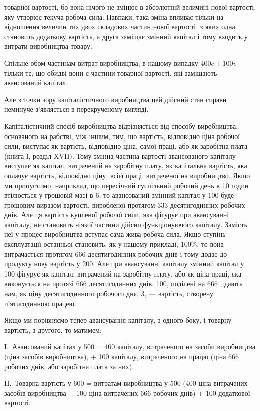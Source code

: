 \parcont{}  %
товарної вартості, бо вона нічого не змінює в абсолютній величині
нової вартості, яку утворює текуча робоча сила. Навпаки,
така зміна впливає тільки на відношення величин тих двох складових
частин нової вартості, з яких одна становить додаткову
вартість, а друга заміщає змінний капітал і тому входить у витрати
виробництва товару.

Спільне обом частинам витрат виробництва, в нашому випадку
$400 c + 100v$ тільки те, що обидві вони є частини товарної
вартості, які заміщають авансований капітал.

Але з точки зору капіталістичного виробництва цей дійсний
стан справи неминуче з’являється в перекрученому вигляді.

Капіталістичний спосіб виробництва відрізняється від способу
виробництва, основаного на рабстві, між іншим, тим, що
вартість, відповідно ціна робочої сили, виступає як вартість,
відповідно ціна, самої праці, або як заробітна плата (книга І,
розділ XVII). Тому змінна частина вартості авансованого капіталу
виступає як капітал, витрачений на заробітну плату,
як капітальна вартість, яка оплачує вартість, відповідно ціну,
всієї праці, витраченої на виробництво. Якщо ми припустимо,
наприклад, що пересічний суспільний робочий день в 10 годин
втілюється у грошовій масі в 6, то авансований
змінний капітал у 100 буде грошовим
виразом вартості, виробленої протягом 333 десятигодинних
робочих днів. Але ця вартість купленої робочої сили, яка фігурує
при авансуванні капіталу, не становить ніякої частини
дійсно функціонуючого капіталу. Замість неї у процес виробництва
вступає сама жива робоча сила. Якщо ступінь експлуатації
останньої становить, як у нашому прикладі, 100\%, то вона
витрачається протягом 666 десятигодинних робочих днів і тому
додає до продукту нову вартість у 200. Але
при авансуванні капіталу змінний капітал у 100
фігурує як капітал, витрачений на заробітну плату, або як
ціна праці, яка виконується на протязі 666  десятигодинних
днів. 100, поділені на 666 , дають нам, як
ціну десятигодинного робочого дня, 3, — вартість, створену
п’ятигодинною працею.

Якщо ми порівняємо тепер авансування капіталу, з одного
боку, і товарну вартість, з другого, то матимем:

I.~Авансований капітал у 500 = 400 капіталу, витраченого на засоби виробництва
(ціна засобів виробництва), + 100 капіталу,
витраченого на працю (ціна 666 робочих днів, або заробітна
плата за них).

II.~Товарна вартість у 600 = витратам виробництва
у 500 (400
ціна витрачених засобів виробництва + 100
ціна витрачених 666 робочих днів) + 100 додаткової вартості.
